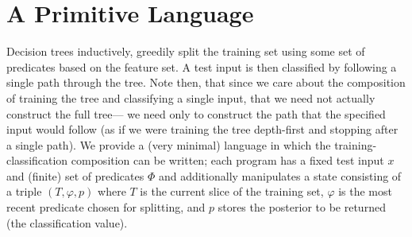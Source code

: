 \section{A Primitive Language}\label{sec:dsl}

Decision trees inductively, greedily split the training set
using some set of predicates based on the feature set.
A test input is then classified by following a single path through the tree.
Note then, that since we care about the composition of training the tree
and classifying a single input,
that we need not actually construct the full tree---%
we need only to construct the path that the specified input would follow
(as if we were training the tree depth-first and stopping after a single path).
We provide a (very minimal) language in which the training-classification
composition can be written;
each program has a fixed test input $x$ and (finite) set of predicates $\Phi$
and additionally manipulates a state consisting of a triple $(T, \varphi, p)$
where $T$ is the current slice of the training set,
$\varphi$ is the most recent predicate chosen for splitting,
and $p$ stores the posterior to be returned (the classification value).

